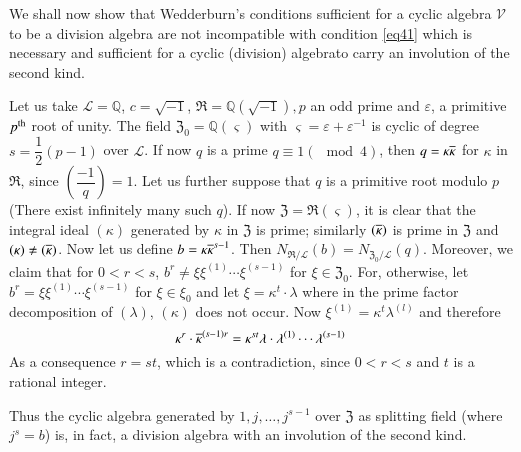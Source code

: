 We shall now show that Wedderburn's conditions sufficient for a cyclic
algebra $\mathscr{V}$ to be a division algebra are not incompatible
with condition \eqref{eq41} which is necessary and sufficient for a cyclic
(division) algebra\pageoriginale to carry an involution of the second
kind. 

Let us take $\mathscr{L}= \mathbb{Q}$, $c=\sqrt{-1}$, $\mathfrak{R} =
\mathbb{Q} (\sqrt{-1}),p$ an odd prime and $\varepsilon$, a primitive
$p^{\rm th}$ root of unity. The field $\mathfrak{Z}_0 = \mathbb{Q}
(\varsigma)$ with $\varsigma = \varepsilon + \varepsilon^{-1}$ is
cyclic of degree $s=\dfrac{1}{2}(p-1)$ over $\mathscr{L}$. If now $q$
is a prime $q\equiv 1(\mod 4)$, then $q=\kappa \overline{\kappa}$ for
$\kappa$ in $\mathfrak{R}$, since $\left(\dfrac{-1}{q}\right) =1$. Let
us further suppose that $q$ is a primitive root modulo $p$ (There
exist infinitely many such $q$). If now $\mathfrak{Z}=
\mathfrak{R}(\varsigma)$, it is clear that the integral ideal
$(\kappa)$ generated by $\kappa$ in $\mathfrak{Z}$ is prime; similarly
$(\overline{\kappa})$ is prime in $\mathfrak{Z}$ and $(\kappa) \neq
(\overline{\kappa})$. Now let us define $b=\kappa\overline{\kappa}^{s-1}$. Then
$N_{\mathfrak{R}/\mathscr{L}}(b) =
N_{\mathfrak{Z}_0/\mathscr{L}}(q)$. Moreover, we claim that for
$0<r<s$, $b^r \neq \xi \xi^{(1)}\cdots \xi^{(s-1)}$ for $\xi \in
\mathfrak{Z}_0$. For, otherwise, let $b^r=\xi\xi^{(1)}\cdots \xi^{(s-1)}$ for
$\xi \in \xi_0$ and let $\xi = \kappa^t\cdot \lambda$ where in the
prime factor decomposition of $(\lambda)$, $(\kappa)$ does not
occur. Now $\xi^{(1)}=\kappa^t \lambda^{(l)}$ and therefore
$$
\kappa^r \cdot \overline{\kappa}^{(s-1)r} = \kappa^{st} \lambda \cdot
\lambda^{(1)} \cdots \lambda^{(s-1)}
$$
As a consequence $r=st$, which is a contradiction, since $0<r<s$ and
$t$ is a rational integer.

Thus the cyclic algebra generated by $1,j,\ldots, j^{s-1}$ over
$\mathfrak{Z}$ as splitting field (where $j^s=b$) is, in fact, a
division algebra with an involution of the second kind.

